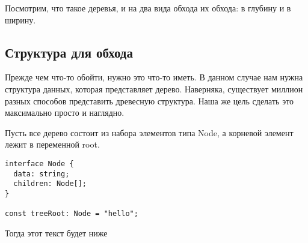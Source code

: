 \documentclass[../article.tex]{subfiles}
\begin{document}
{Посмотрим, что такое деревья, и на два вида обхода их обхода: в глубину и в ширину.}

\subsection{Структура для обхода}

Прежде чем что-то обойти, нужно это что-то иметь. В данном случае нам нужна структура данных, которая представляет дерево. Наверняка, существует миллион разных способов представить древесную структура. Наша же цель сделать это максимально просто и наглядно.


Пусть все дерево состоит из набора элементов типа {\firacodebold Node}, а корневой элемент лежит в переменной {\firacodebold root}.
\begin{strip}
    \begin{ruledtitle}
        {
            \begin{lstlisting}
interface Node {
  data: string;
  children: Node[];
}

const treeRoot: Node = "hello";
            \end{lstlisting}
        }
    \end{ruledtitle}
\end{strip}

Тогда этот текст будет ниже
\end{document}
